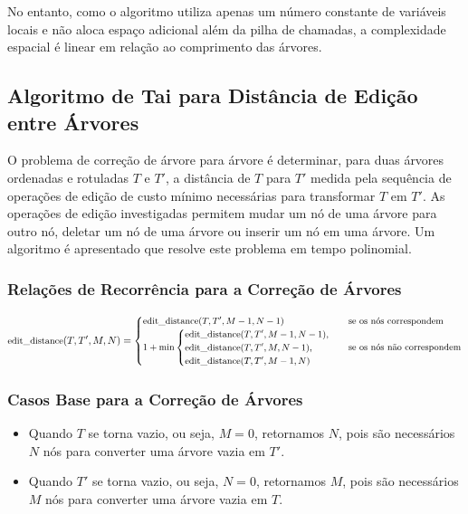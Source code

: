 \documentclass[12pt]{article}
\begin{document}
No entanto, como o algoritmo utiliza apenas um número constante de variáveis locais e não aloca espaço adicional além da pilha de chamadas, a complexidade espacial é linear em relação ao comprimento das árvores.


\subsection{Algoritmo de Tai para Distância de Edição entre Árvores}

O problema de correção de árvore para árvore é determinar, para duas árvores ordenadas e rotuladas \( T \) e \( T' \), a distância de \( T \) para \( T' \) medida pela sequência de operações de edição de custo mínimo necessárias para transformar \( T \) em \( T' \). As operações de edição investigadas permitem mudar um nó de uma árvore para outro nó, deletar um nó de uma árvore ou inserir um nó em uma árvore. Um algoritmo é apresentado que resolve este problema em tempo polinomial.

\subsubsection{Relações de Recorrência para a Correção de Árvores}

\[
\small
\text{edit\_distance}(T, T', M, N) = 
\begin{cases} 
    \text{edit\_distance}(T, T', M-1, N-1) & \text{se os nós correspondem} \\
    1 + \min \begin{cases}
\text{edit\_distance}(T, T', M-1, N-1), \\
\text{edit\_distance}(T, T', M, N-1), \\
\text{edit\_distance}(T, T', M-1, N)
\end{cases} & \text{se os nós não correspondem}
\end{cases}
\]

\subsubsection{Casos Base para a Correção de Árvores}

\begin{itemize}
    \item Quando \( T \) se torna vazio, ou seja, \( M = 0 \), retornamos \( N \), pois são necessários \( N \) nós para converter uma árvore vazia em \( T' \).
    \item Quando \( T' \) se torna vazio, ou seja, \( N = 0 \), retornamos \( M \), pois são necessários \( M \) nós para converter uma árvore vazia em \( T \).
\end{itemize}
\end{document}
